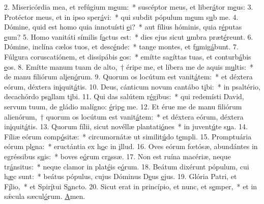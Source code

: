 2. Misericórdia mea, et refúgium m\uline{e}um:~* suscéptor meus, et liber\uline{á}tor m\uline{e}us:
3. Protéctor meus, et in ipso sper\uline{á}vi:~* qui subdit pópulum m\uline{e}um s\uline{u}b me.
4. Dómine, quid est homo quia innotuísti \uline{e}i?~* aut fílius hóminis, quia r\uline{é}putas \uline{e}um?
5. Homo vanitáti símilis f\uline{a}ctus est:~* dies ejus sicut \uline{u}mbra præt\uline{é}reunt.
6. Dómine, inclína cælos tuos, et desc\uline{é}nde:~* tange montes, et f\uline{u}mig\uline{á}bunt.
7. Fúlgura coruscatiónem, et dissipábis \uline{e}os:~* emítte sagíttas tuas, et conturb\uline{á}bis \uline{e}os.
8. Emítte manum tuam de alto,~† éripe me, et líbera me de aquis m\uline{u}ltis:~* de manu filiórum al\uline{i}en\uline{ó}rum.
9. Quorum os locútum est vanit\uline{á}tem:~* et déxtera eórum, déxtera in\uline{i}quit\uline{á}tis.
10. Deus, cánticum novum cantábo t\uline{i}bi:~* in psaltério, decachórdo ps\uline{a}llam t\uline{i}bi.
11. Qui das salútem r\uline{é}gibus:~* qui redemísti David, servum tuum, de gládio malígno: \uline{é}rip\uline{e} me.
12. Et érue me de manu filiórum alienórum,~† quorum os locútum est vanit\uline{á}tem:~* et déxtera eórum, déxtera in\uline{i}quit\uline{á}tis.
13. Quorum fílii, sicut novéllæ plantati\uline{ó}nes~* in juvent\uline{ú}te s\uline{u}a.
14. Fíliæ eórum comp\uline{ó}sitæ:~* circumornátæ ut similit\uline{ú}do t\uline{e}mpli.
15. Promptuária eórum pl\uline{e}na:~* eructántia ex h\uline{o}c in \uline{i}llud.
16. Oves eórum fœtósæ, abundántes in egréssibus s\uline{u}is:~* boves e\uline{ó}rum cr\uline{a}ssæ.
17. Non est ruína macériæ, neque tr\uline{á}nsitus:~* neque clamor in plat\uline{é}is e\uline{ó}rum.
18. Beátum dixérunt pópulum, cui h\uline{æ}c sunt:~* beátus pópulus, cujus Dóminus D\uline{e}us \uline{e}jus.
19. Glória Patri, et F\uline{í}lio,~* et Spir\uline{í}tui S\uline{a}ncto.
20. Sicut erat in princípio, et nunc, et s\uline{e}mper,~* et in sǽcula sæcul\uline{ó}rum. \uline{A}men.
